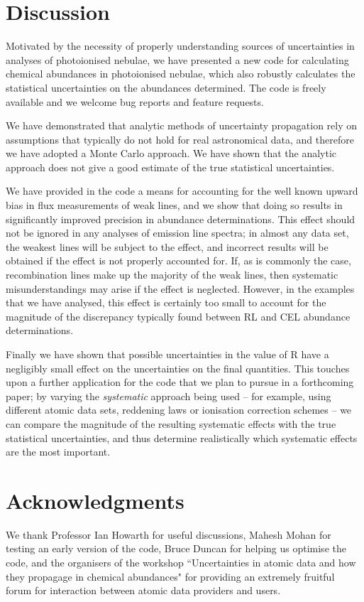 \documentclass[useAMS,usenatbib]{mn2e}
\begin{document}
\section{Discussion}

Motivated by the necessity of properly understanding sources of uncertainties in analyses of photoionised nebulae, we have presented a new code for calculating chemical abundances in photoionised nebulae, which also robustly calculates the statistical uncertainties on the abundances determined.  The code is freely available and we welcome bug reports and feature requests.

We have demonstrated that analytic methods of uncertainty propagation rely on assumptions that typically do not hold for real astronomical data, and therefore we have adopted a Monte Carlo approach.  We have shown that the analytic approach does not give a good estimate of the true statistical uncertainties.

We have provided in the code a means for accounting for the well known upward bias in flux measurements of weak lines, and we show that doing so results in significantly improved precision in abundance determinations.  This effect should not be ignored in any analyses of emission line spectra; in almost any data set, the weakest lines will be subject to the effect, and incorrect results will be obtained if the effect is not properly accounted for.  If, as is commonly the case, recombination lines make up the majority of the weak lines, then systematic misunderstandings may arise if the effect is neglected.  However, in the examples that we have analysed, this effect is certainly too small to account for the magnitude of the discrepancy typically found between RL and CEL abundance determinations.

Finally we have shown that possible uncertainties in the value of R have a negligibly small effect on the uncertainties on the final quantities.  This touches upon a further application for the code that we plan to pursue in a forthcoming paper; by varying the {\it systematic} approach being used -- for example, using different atomic data sets, reddening laws or ionisation correction schemes -- we can compare the magnitude of the resulting systematic effects with the true statistical uncertainties, and thus determine realistically which systematic effects are the most important.

\section*{Acknowledgments}

We thank Professor Ian Howarth for useful discussions, Mahesh Mohan for testing an early version of the code, Bruce Duncan for helping us optimise the code, and the organisers of the workshop ``Uncertainties in atomic data and how they propagage in chemical abundances" for providing an extremely fruitful forum for interaction between atomic data providers and users.





\label{lastpage}
\end{document}
